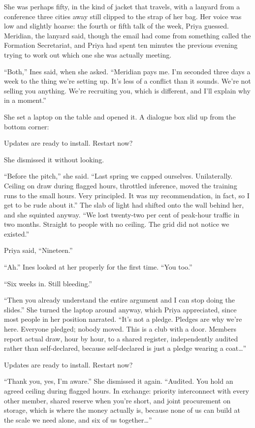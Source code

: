 \documentclass[11pt]{article}
\newcommand{\aivoice}{\aivoicefont}
\newcommand{\uitext}[1]{%
  \par\vspace{0.7\baselineskip}%
  {\centering\aivoice\small #1\par}%
  \vspace{0.7\baselineskip}\noindent}
\begin{document}
She was perhaps fifty, in the kind of jacket that travels, with a lanyard from a conference three cities away still clipped to the strap of her bag. Her voice was low and slightly hoarse: the fourth or fifth talk of the week, Priya guessed. Meridian, the lanyard said, though the email had come from something called the Formation Secretariat, and Priya had spent ten minutes the previous evening trying to work out which one she was actually meeting.

``Both,'' Ines said, when she asked. ``Meridian pays me. I'm seconded three days a week to the thing we're setting up. It's less of a conflict than it sounds. We're not selling you anything. We're recruiting you, which is different, and I'll explain why in a moment.''

She set a laptop on the table and opened it. A dialogue box slid up from the bottom corner:

\uitext{Updates are ready to install. Restart now?}

She dismissed it without looking.

``Before the pitch,'' she said. ``Last spring we capped ourselves. Unilaterally. Ceiling on draw during flagged hours, throttled inference, moved the training runs to the small hours. Very principled. It was my recommendation, in fact, so I get to be rude about it.'' The slab of light had shifted onto the wall behind her, and she squinted anyway. ``We lost twenty-two per cent of peak-hour traffic in two months. Straight to people with no ceiling. The grid did not notice we existed.''

Priya said, ``Nineteen.''

``Ah.'' Ines looked at her properly for the first time. ``You too.''

``Six weeks in. Still bleeding.''

``Then you already understand the entire argument and I can stop doing the slides.'' She turned the laptop around anyway, which Priya appreciated, since most people in her position narrated. ``It's not a pledge. Pledges are why we're here. Everyone pledged; nobody moved. This is a club with a door. Members report actual draw, hour by hour, to a shared register, independently audited rather than self-declared, because self-declared is just a pledge wearing a coat…''

\uitext{Updates are ready to install. Restart now?}

``Thank you, yes, I'm aware.'' She dismissed it again. ``Audited. You hold an agreed ceiling during flagged hours. In exchange: priority interconnect with every other member, shared reserve when you're short, and joint procurement on storage, which is where the money actually is, because none of us can build at the scale we need alone, and six of us together…''
\end{document}
